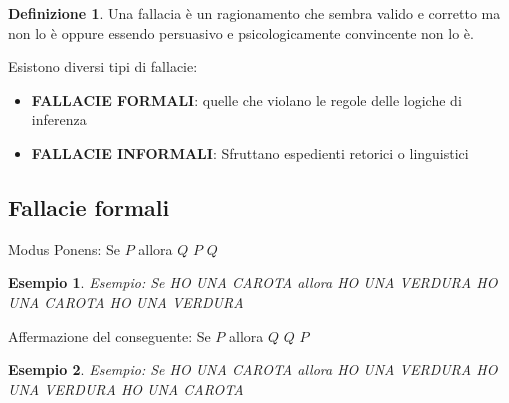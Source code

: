 \documentclass[../main.tex, class=article, 12pt]{subfiles}
\newtheorem{exmp}{Esempio}[section]
\theoremstyle{definition}
\newtheorem{definition}{Definizione}[section]
\begin{document}
\begin{definition}
        Una fallacia è un ragionamento che sembra valido e corretto ma non lo è oppure essendo persuasivo e psicologicamente convincente non lo è. \par
\end{definition}

Esistono diversi tipi di fallacie:
\begin{itemize}
        \item \textbf{FALLACIE FORMALI}: quelle che violano le regole delle logiche di inferenza 
        \item \textbf{FALLACIE INFORMALI}: Sfruttano espedienti retorici o linguistici 
\end{itemize}



\subsection{Fallacie formali}\label{sec:fallacie_formali}
\begin{tcolorbox}
        Modus Ponens: \newline 
        Se $ P $ allora $ Q $ \newline
        $ P $ \newline
        $ Q $ \newline 
\end{tcolorbox} 
\begin{exmp}
        Esempio: \newline
        Se HO UNA CAROTA allora HO UNA VERDURA \newline
        HO UNA CAROTA \newline
        HO UNA VERDURA \newline 
\end{exmp}

\begin{tcolorbox}
        Affermazione del conseguente: \newline
        Se $ P $ allora $ Q $ \newline
        $ Q $ \newline
        $ P $ \newline 
\end{tcolorbox}
\begin{exmp}
        Esempio: \newline
        Se HO UNA CAROTA allora HO UNA VERDURA \newline
        HO UNA VERDURA \newline 
        HO UNA CAROTA \newline
\end{exmp}
\end{document}

